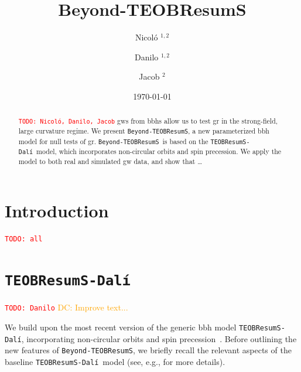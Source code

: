 \documentclass[prd,amssymb,amsmath,amsfonts,nofootinbib,reprint,showpacs,longbibliography]{revtex4-1}
\def\TEOBResumSDali{\texttt{TEOBResumS-Dalí}}
\def\TEOBB{\texttt{Beyond-TEOBResumS}}
\newcommand{\DC}[1]{{\textcolor{orange}{{DC: #1}} }}
\newcommand{\todo}[1]{\textcolor{red}{\texttt{TODO: #1}}}
\newcommand{\dali}[0]{\texttt{TEOBResumS-Dalí}}
\begin{document}
\title{Beyond-TEOBResumS}

\author{Nicol\'o ${}^{1,2}$}
\author{Danilo ${}^{1,2}$}
\author{Jacob ${}^{2}$}


\begin{abstract}
\todo{Nicol\'o, Danilo, Jacob}
\Acp{gw} from \acp{bbh} allow us to test \ac{gr} in the strong-field, large curvature regime.
We present \TEOBB, a new parameterized \ac{bbh} model for null tests of \ac{gr}.
\TEOBB~is based on the \TEOBResumSDali~model, which incorporates non-circular orbits and spin precession.
We apply the model to both real and simulated \ac{gw} data, and show that \dots
\end{abstract}

\date{\today}
\maketitle

\acresetall

\section{Introduction}
\todo{all}

\section{\dali}
\label{sec:dali_base}
\todo{Danilo}
\DC{Improve text...}

We build upon the most recent version of the generic \ac{bbh} model \TEOBResumSDali, incorporating non-circular
orbits and spin precession~\cite{Nagar:2024oyk, Gamba:2024cvy, Albanesi:2025txj}. 
Before outlining the new features of \TEOBB, we briefly recall the relevant
aspects of the baseline \dali~model (see, e.g., \cite{Nagar:2024oyk} for more details).
\end{document}

